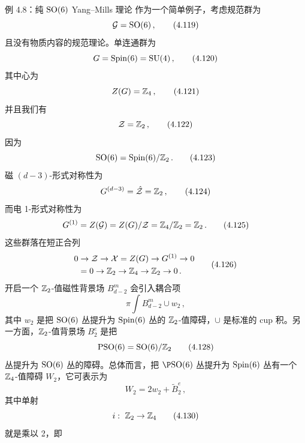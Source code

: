 \begin{examplebox}{例 4.8：纯 $\mathrm{SO}(6)$ Yang--Mills 理论}
作为一个简单例子，考虑规范群为
\begin{equation}
\mathcal{G}=\mathrm{SO}(6)\,,
\tag{4.119}
\end{equation}
且没有物质内容的规范理论。单连通群为
\begin{equation}
G=\mathrm{Spin}(6)=\mathrm{SU}(4)\,,
\tag{4.120}
\end{equation}
其中心为
\begin{equation}
Z(G)=\mathbb{Z}_4\,,
\tag{4.121}
\end{equation}
并且我们有
\begin{equation}
\mathcal{Z}=\mathbb{Z}_2\,,
\tag{4.122}
\end{equation}
因为
\begin{equation}
\mathrm{SO}(6)=\mathrm{Spin}(6)/\mathbb{Z}_2\,.
\tag{4.123}
\end{equation}
磁 $(d-3)$-形式对称性为
\begin{equation}
G^{(d-3)}=\hat{\mathcal{Z}}=\mathbb{Z}_2\,,
\tag{4.124}
\end{equation}
而电 1-形式对称性为
\begin{equation}
G^{(1)}=Z(\mathcal{G})=Z(G)/\mathcal{Z}=\mathbb{Z}_4/\mathbb{Z}_2=\mathbb{Z}_2\,.
\tag{4.125}
\end{equation}
这些群落在短正合列
\begin{equation}
\begin{aligned}
0&\to\mathcal{Z}\to\mathcal{X}=Z(G)\to G^{(1)}\to 0\\
&=0\to\mathbb{Z}_2\to\mathbb{Z}_4\to\mathbb{Z}_2\to 0\,.
\end{aligned}
\tag{4.126}
\end{equation}
开启一个 $\mathbb{Z}_2$-值磁性背景场 $B^m_{d-2}$ 会引入耦合项
\begin{equation}
\pi\int B^m_{d-2}\cup w_2\,,
\tag{4.127}
\end{equation}
其中 $w_2$ 是把 $\mathrm{SO}(6)$ 丛提升为 $\mathrm{Spin}(6)$ 丛的 $\mathbb{Z}_2$-值障碍，$\cup$ 是标准的 cup 积。另一方面，$\mathbb{Z}_2$-值背景场 $B_2^e$ 是把
\begin{equation}
\mathrm{PSO}(6)=\mathrm{SO}(6)/\mathbb{Z}_2
\tag{4.128}
\end{equation}
丛提升为 $\mathrm{SO}(6)$ 丛的障碍。总体而言，把 $\P\SO(6)$ 丛提升为 $\mathrm{Spin}(6)$ 丛有一个 $\mathbb{Z}_4$-值障碍 $W_2$，它可表示为
\begin{equation}
W_2=2w_2+\tilde{B}_2^e\,,
\tag{4.129}
\end{equation}
其中单射
\begin{equation}
i:\ \mathbb{Z}_2\to\mathbb{Z}_4
\tag{4.130}
\end{equation}
就是乘以 2，即
\begin{equation}

\end{equation}
\end{examplebox}
